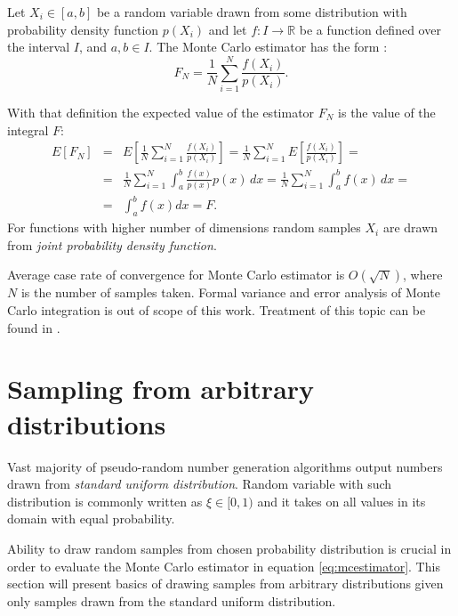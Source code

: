 \begin{df}
  Let $X_{i} \in [a,b]$ be a random variable drawn from some distribution with probability density function $p(X_{i})$ and let $f: I \rightarrow \mathbb{R}$ be a function defined over the interval $I$, and $a,b \in I$. The Monte Carlo estimator has the form \parencite{veach97}:
\begin{equation}
\label{eq:mcestimator}
  F_{N} = \frac{1}{N} \sum_{i=1}^{N} \frac{f(X_{i})}{p(X_{i})}.
\end{equation}
\end{df}
With that definition the expected value of the estimator $F_{N}$ is the value of the integral $F$:
\begin{eqnarray}
  E[F_{N}] &=& E\left[ \frac{1}{N} \sum_{i=1}^{N} \frac{f(X_{i})}{p(X_{i})} \right]
  = \frac{1}{N} \sum_{i=1}^{N} E \left[ \frac{f(X_{i})}{p(X_{i})} \right] = \nonumber \\
  &=& \frac{1}{N} \sum_{i=1}^{N} \int_{a}^{b} \frac{f(x)}{p(x)} p(x) \,dx
  = \frac{1}{N} \sum_{i=1}^{N} \int_{a}^{b} f(x) \,dx = \nonumber \\
  &=& \int_{a}^{b} f(x)dx = F.
\end{eqnarray}
For functions with higher number of dimensions random samples $X_{i}$ are drawn from \emph{joint probability density function}.

Average case rate of convergence for Monte Carlo estimator is $O(\sqrt{N})$, where $N$ is the number of samples taken. Formal variance and error analysis of Monte Carlo integration is out of scope of this work. Treatment of this topic can be found in \cite{robert2004}.

\section{Sampling from arbitrary distributions}
Vast majority of pseudo-random number generation algorithms output numbers drawn from \emph{standard uniform distribution}. Random variable with such distribution is commonly written as $\xi \in [0,1)$ and it takes on all values in its domain with equal probability.

Ability to draw random samples from chosen probability distribution is crucial in order to evaluate the Monte Carlo estimator in equation \ref{eq:mcestimator}. This section will present basics of drawing samples from arbitrary distributions given only samples drawn from the standard uniform distribution.

